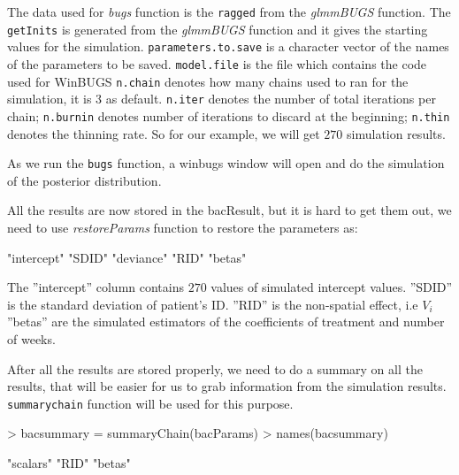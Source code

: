 \documentclass{article}
\begin{document}
The data used for \textit{bugs} function is the \verb!ragged! from the \textit{glmmBUGS} function. 
The \verb!getInits! is generated from the \textit{glmmBUGS} function and it gives the starting values for the simulation. 
\verb!parameters.to.save! is a character vector of the names of the parameters to be saved.
\verb!model.file! is the file which contains the code used for WinBUGS
\verb!n.chain! denotes how many chains used to ran for the simulation, it is $3$ as default.
\verb!n.iter! denotes the number of total iterations per chain; 
\verb!n.burnin! denotes number of iterations to discard at the beginning; 
\verb!n.thin! denotes the thinning rate. So for our example, we will get $270$ simulation results.

As we run the \verb!bugs! function, a winbugs window will open and do the simulation of the posterior distribution.

All the results are now stored in the bacResult, but it is hard to get them out, we need to use  \textit{restoreParams} function to restore the parameters as: 

\begin{Schunk}
\begin{Soutput}
[1] "intercept" "SDID"      "deviance"  "RID"       "betas"    
\end{Soutput}
\end{Schunk}


The ''intercept'' column contains $270$ values of simulated intercept values. 
''SDID'' is the standard deviation of patient's ID. 
''RID'' is the non-spatial effect, i.e $V_i$
''betas'' are the simulated estimators of the coefficients of treatment and number of weeks. 

After all the results are stored properly, we need to do a summary on all the results, that will be easier for us to grab information from the simulation results. \verb!summarychain! function will be used for this purpose.

\begin{Schunk}
\begin{Sinput}
> bacsummary = summaryChain(bacParams)
> names(bacsummary)
\end{Sinput}
\begin{Soutput}
[1] "scalars" "RID"     "betas"  
\end{Soutput}
\end{Schunk}
\end{document}
